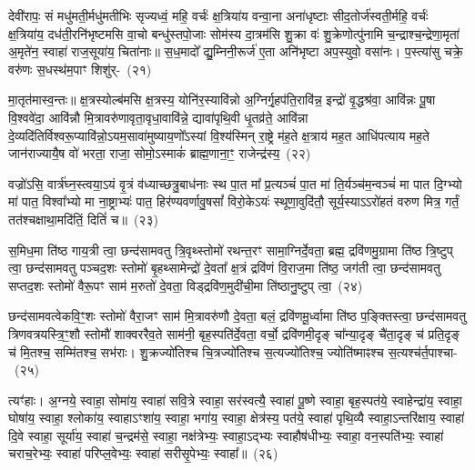 {\anuvakamend[{अत्येका॑\-दश च}]}%

देवी॑रापः॒ सं मधु॑मती॒र्मधु॑मतीभिः सृज्यध्वं॒ महि॒ वर्चः॑ क्ष॒त्रिया॑य वन्वा॒ना अना॑धृष्टाः सीद॒तोर्ज॑स्वती॒र्महि॒ वर्चः॑ क्ष॒त्रिया॑य॒ दध॑ती॒रनि॑भृष्टमसि वा॒चो बन्धु॑स्तपो॒जाः सोम॑स्य दा॒त्रम॑सि शु॒क्रा वः॑ शु॒क्रेणोत्पु॑नामि च॒न्द्राश्च॒न्द्रेणा॒मृता॑ अ॒मृते॑न॒ स्वाहा॑ राज॒सूया॑य॒ चिता॑नाः॥ स॒ध॒मादो᳚ द्यु॒म्निनी॒रूर्ज॑ ए॒ता अनि॑भृष्टा अप॒स्युवो॒ वसा॑नः। प॒स्त्या॑सु चक्रे॒ वरु॑णः स॒धस्थ॑म॒पाꣳ शिशु॑र्-~(२१)

मा॒तृत॑मास्व॒न्तः॥ क्ष॒त्रस्योल्ब॑मसि क्ष॒त्रस्य॒ योनि॑र॒स्यावि॑न्नो अ॒ग्निर्गृ॒हप॑ति॒रावि॑न्न॒ इन्द्रो॑ वृ॒द्धश्र॑वा॒ आवि॑न्नः पू॒षा वि॒श्ववे॑दा॒ आवि॑न्नौ मि॒त्रावरु॑णावृता॒वृधा॒वावि॑न्ने॒ द्यावा॑पृथि॒वी धृ॒तव्र॑ते॒ आवि॑न्ना दे॒व्यदि॑तिर्विश्वरू॒प्यावि॑न्नो॒\-ऽयम॒सावा॑मुष्याय॒णो᳚\-ऽस्यां वि॒श्य॑स्मिन् रा॒ष्ट्रे म॑ह॒ते क्ष॒त्राय॑ मह॒त आधि॑पत्याय मह॒ते जान॑राज्यायै॒ष वो॑ भरता॒ राजा॒ सोमो॒\-ऽस्माकं॑ ब्राह्म॒णाना॒ꣳ॒ राजेन्द्र॑स्य॒~(२२)

वज्रो॑\-ऽसि॒ वार्त्र॑घ्न॒स्त्वया॒ऽयं वृ॒त्रं व॑ध्याच्छत्रु॒बाध॑नाः स्थ पा॒त मा᳚ प्र॒त्यञ्चं॑ पा॒त मा॑ ति॒र्यञ्च॑म॒न्वञ्चं॑ मा पात दि॒ग्भ्यो मा॑ पात॒ विश्वा᳚भ्यो मा ना॒ष्ट्राभ्यः॑ पात॒ हिर॑ण्यवर्णावु॒षसां᳚ विरो॒के\-ऽयः॑ स्थूणा॒वुदि॑तौ॒ सूर्य॒स्या\-ऽ\-ऽरो॑हतं वरुण मित्र॒ गर्तं॒ तत॑श्चक्षाथा॒मदि॑तिं॒ दितिं॑ च॥~(२३)

{\anuvakamend[{शिशु॒रिन्द्र॒स्यैक॑चत्वारिꣳशच्च}]}%

स॒मिध॒मा ति॑ष्ठ गाय॒त्री त्वा॒ छन्द॑सामवतु त्रि॒वृथ्स्तोमो॑ रथन्त॒रꣳ सामा॒ग्निर्दे॒वता॒ ब्रह्म॒ द्रवि॑णमु॒ग्रामा ति॑ष्ठ त्रि॒ष्टुप् त्वा॒ छन्द॑सामवतु पञ्चद॒शः स्तोमो॑ बृ॒हथ्सामेन्द्रो॑ दे॒वता᳚ क्ष॒त्रं द्रवि॑णं वि॒राज॒मा ति॑ष्ठ॒ जग॑ती त्वा॒ छन्द॑सामवतु सप्तद॒शः स्तोमो॑ वैरू॒पꣳ साम॑ म॒रुतो॑ दे॒वता॒ विड्द्रवि॑ण॒मुदी॑ची॒मा ति॑ष्ठानु॒ष्टुप् त्वा॒~(२४)

छन्द॑सामवत्वेकवि॒ꣳ॒शः स्तोमो॑ वैरा॒जꣳ साम॑ मि॒त्रावरु॑णौ दे॒वता॒ बलं॒ द्रवि॑णमू॒र्ध्वामा ति॑ष्ठ प॒ङ्क्तिस्त्वा॒ छन्द॑सामवतु त्रिणवत्रयस्त्रि॒ꣳ॒शौ स्तोमौ॑ शाक्वररैव॒ते साम॑नी॒ बृह॒स्पति॑र्दे॒वता॒ वर्चो॒ द्रवि॑णमी॒दृङ् चा᳚न्या॒दृङ् चै॑ता॒दृङ् च॑ प्रति॒दृङ् च॑ मि॒तश्च॒ सम्मि॑तश्च॒ सभ॑राः। शु॒क्रज्यो॑तिश्च चि॒त्रज्यो॑तिश्च स॒त्यज्यो॑तिश्च॒ ज्योति॑ष्माꣴश्च स॒त्यश्च॑र्त॒पाश्चा-~(२५)

त्यꣳ॑हाः। अ॒ग्नये॒ स्वाहा॒ सोमा॑य॒ स्वाहा॑ सवि॒त्रे स्वाहा॒ सर॑स्वत्यै॒ स्वाहा॑ पू॒ष्णे स्वाहा॒ बृह॒स्पत॑ये॒ स्वाहेन्द्रा॑य॒ स्वाहा॒ घोषा॑य॒ स्वाहा॒ श्लोका॑य॒ स्वाहा\-ऽꣳशा॑य॒ स्वाहा॒ भगा॑य॒ स्वाहा॒ क्षेत्र॑स्य॒ पत॑ये॒ स्वाहा॑ पृथि॒व्यै स्वाहा॒\-ऽन्तरि॑क्षाय॒ स्वाहा॑ दि॒वे स्वाहा॒ सूर्या॑य॒ स्वाहा॑ च॒न्द्रम॑से॒ स्वाहा॒ नक्ष॑त्रेभ्यः॒ स्वाहा॒\-ऽद्भ्यः स्वाहौष॑धीभ्यः॒ स्वाहा॒ वन॒स्पति॑भ्यः॒ स्वाहा॑ चराच॒रेभ्यः॒ स्वाहा॑ परिप्ल॒वेभ्यः॒ स्वाहा॑ सरीसृ॒पेभ्यः॒ स्वाहा᳚॥~(२६)

